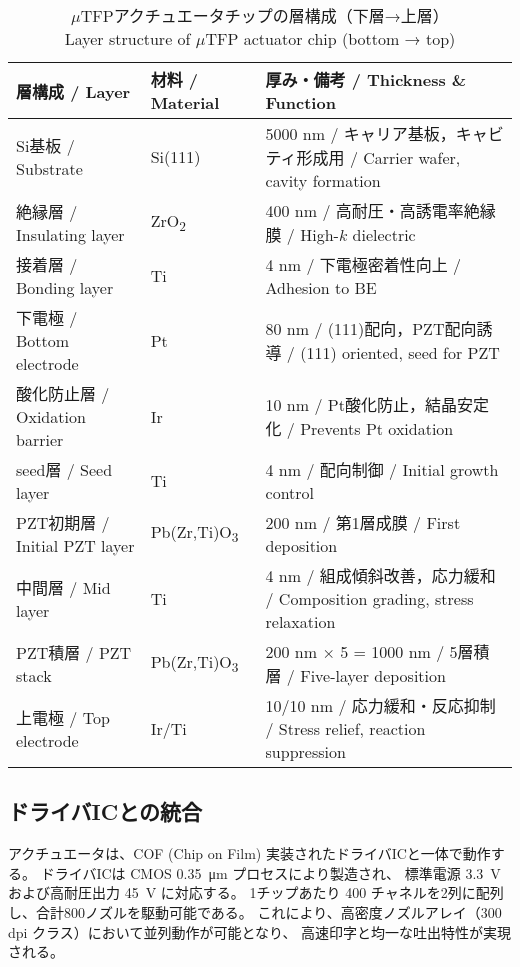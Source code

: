 \documentclass[conference]{IEEEtran}
\begin{document}
\begin{table*}[t]
  \centering
  \caption{%
    $\mu$TFPアクチュエータチップの層構成（下層→上層）\\
    Layer structure of $\mu$TFP actuator chip (bottom → top)
  }
  \label{tab:layer-structure}
  \begin{tabular}{lll}
    \hline
    \textbf{層構成 / Layer} & \textbf{材料 / Material} & \textbf{厚み・備考 / Thickness \& Function} \\
    \hline
    Si基板 / Substrate & Si(111) & 5000 nm / キャリア基板，キャビティ形成用 / Carrier wafer, cavity formation \\
    絶縁層 / Insulating layer & ZrO\textsubscript{2} & 400 nm / 高耐圧・高誘電率絶縁膜 / High-$k$ dielectric \\
    接着層 / Bonding layer & Ti & 4 nm / 下電極密着性向上 / Adhesion to BE \\
    下電極 / Bottom electrode & Pt & 80 nm / (111)配向，PZT配向誘導 / (111) oriented, seed for PZT \\
    酸化防止層 / Oxidation barrier & Ir & 10 nm / Pt酸化防止，結晶安定化 / Prevents Pt oxidation \\
    seed層 / Seed layer & Ti & 4 nm / 配向制御 / Initial growth control \\
    PZT初期層 / Initial PZT layer & Pb(Zr,Ti)O\textsubscript{3} & 200 nm / 第1層成膜 / First deposition \\
    中間層 / Mid layer & Ti & 4 nm / 組成傾斜改善，応力緩和 / Composition grading, stress relaxation \\
    PZT積層 / PZT stack & Pb(Zr,Ti)O\textsubscript{3} & 200 nm × 5 = 1000 nm / 5層積層 / Five-layer deposition \\
    上電極 / Top electrode & Ir/Ti & 10/10 nm / 応力緩和・反応抑制 / Stress relief, reaction suppression \\
    \hline
  \end{tabular}
\end{table*}

\subsection{ドライバICとの統合}
アクチュエータは、COF (Chip on Film) 実装されたドライバICと一体で動作する。
ドライバICは CMOS \SI{0.35}{\micro\metre} プロセスにより製造され、
標準電源 \SI{3.3}{V} および高耐圧出力 \SI{45}{V} に対応する。
1チップあたり 400 チャネルを2列に配列し、合計800ノズルを駆動可能である。
これにより、高密度ノズルアレイ（300\,dpi クラス）において並列動作が可能となり、
高速印字と均一な吐出特性が実現される。
\end{document}
